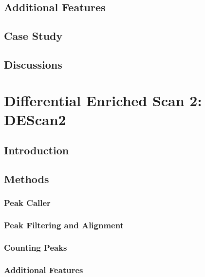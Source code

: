 \documentclass[a4paper, oneside, british, intoc, bibliograph=totoc, index=totoc, BCOR10mm, twoside, openright]{book}
\numberwithin{equation}{section}
\numberwithin{figure}{section}
\begin{document}
\section{Additional Features} \label{sec:ticorseraddfeat}

\section{Case Study} \label{sec:ticorseresults}

\section{Discussions} \label{sec:ticorseconclusions}



\chapter{Differential Enriched Scan 2: DEScan2} \label{sec:descan2cap}

\section{Introduction} \label{sec:descan2intro}

\section{Methods} \label{sec:descan2methods}

\subsection{Peak Caller} \label{sec:descan2peakcall}

\subsection{Peak Filtering and Alignment} \label{sec:descan2filtering}

\subsection{Counting Peaks} \label{sec:descan2peakcounts}

\subsection{Additional Features} \label{sec:descan2addfeat}

\end{document}
